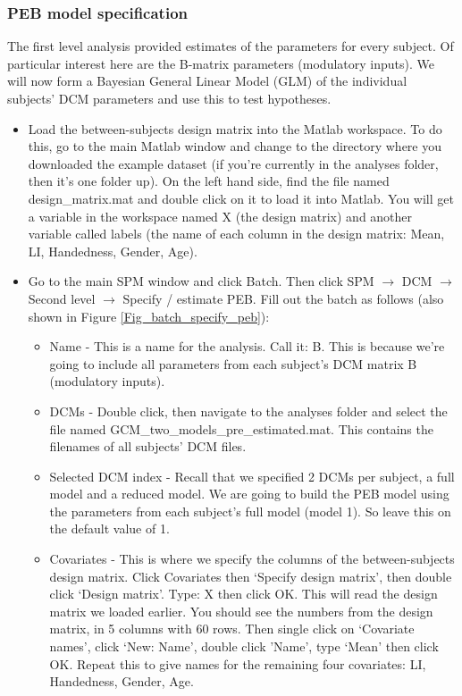 \documentclass{article}
\begin{document}
\subsubsection{PEB model specification} \label{GUI_PEBspec}
The first level analysis provided estimates of the parameters for every subject. Of particular interest here are the B-matrix parameters (modulatory inputs). We will now form a Bayesian General Linear Model (GLM) of the individual subjects' DCM parameters and use this to test hypotheses. 
\begin{itemize}
    \item Load the between-subjects design matrix into the Matlab workspace. To do this, go to the main Matlab window and change to the directory where you downloaded the example dataset (if you're currently in the analyses folder, then it's one folder up). On the left hand side, find the file named design\_matrix.mat and double click on it to load it into Matlab. You will get a variable in the workspace named X (the design matrix) and another variable called labels (the name of each column in the design matrix: Mean, LI, Handedness, Gender, Age). 
    \item Go to the main SPM window and click Batch. Then click SPM $\rightarrow$ DCM $\rightarrow$ Second level $\rightarrow$ Specify / estimate PEB. Fill out the batch as follows (also shown in Figure \ref{Fig_batch_specify_peb}):
    
    \begin{itemize}
        \item Name - This is a name for the analysis. Call it: B. This is because we're going to include all parameters from each subject's DCM matrix B (modulatory inputs).
        
        \item DCMs - Double click, then navigate to the analyses folder and select the file named  GCM\_two\_models\_pre\_estimated.mat. This contains the filenames of all subjects' DCM files.
        
        \item Selected DCM index - Recall that we specified 2 DCMs per subject, a full model and a reduced model. We are going to build the PEB model using the parameters from each subject's full model (model 1). So leave this on the default value of 1.
        
        \item Covariates - This is where we specify the columns of the  between-subjects design matrix. Click Covariates then `Specify design matrix', then double click `Design matrix'. Type: X then click OK. This will read the design matrix we loaded earlier. You should see the numbers from the design matrix, in 5 columns with 60 rows. Then single click on `Covariate names', click `New: Name', double click 'Name', type `Mean' then click OK.  Repeat this to give names for the remaining four covariates: LI, Handedness, Gender, Age.
        

\end{itemize}
\end{itemize}
\end{document}
